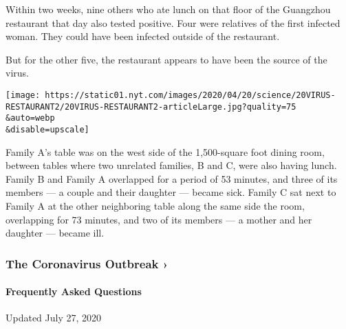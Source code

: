 Within two weeks, nine others who ate lunch on that floor of the
Guangzhou restaurant that day also tested positive. Four were relatives
of the first infected woman. They could have been infected outside of
the restaurant.

But for the other five, the restaurant appears to have been the source
of the virus.

\texttt{[image: https://static01.nyt.com/images/2020/04/20/science/20VIRUS-RESTAURANT2/20VIRUS-RESTAURANT2-articleLarge.jpg?quality=75\\\&auto=webp\\\&disable=upscale]}

Family A's table was on the west side of the 1,500-square foot dining
room, between tables where two unrelated families, B and C, were also
having lunch. Family B and Family A overlapped for a period of 53
minutes, and three of its members --- a couple and their daughter ---
became sick. Family C sat next to Family A at the other neighboring
table along the same side the room, overlapping for 73 minutes, and two
of its members --- a mother and her daughter --- became ill.

\href{https://www.nytimes.com/news-event/coronavirus?action=click\&pgtype=Article\&state=default\&region=MAIN_CONTENT_3\&context=storylines_faq}{}

\hypertarget{the-coronavirus-outbreak-}{%
\subsubsection{The Coronavirus Outbreak
›}\label{the-coronavirus-outbreak-}}

\hypertarget{frequently-asked-questions}{%
\paragraph{Frequently Asked
Questions}\label{frequently-asked-questions}}

Updated July 27, 2020

